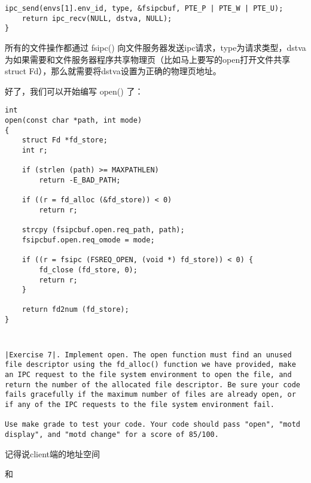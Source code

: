 \documentclass{article}
\newcommand{\funcname}[1]{{\ttfamily \small #1}}
\begin{document}
\begin{CJK*}{UTF8}{gkai}
\begin{lstlisting}[style=ccode, title={\scriptsize \ttfamily \bfseries lib/file.c: fsipc()}]
	ipc_send(envs[1].env_id, type, &fsipcbuf, PTE_P | PTE_W | PTE_U);
	return ipc_recv(NULL, dstva, NULL);
}
\end{lstlisting}

所有的文件操作都通过 \funcname{fsipc()} 向文件服务器发送ipc请求，type为请求类型，dstva为如果需要和文件服务器程序共享物理页（比如马上要写的open打开文件共享struct Fd），那么就需要将dstva设置为正确的物理页地址。

好了，我们可以开始编写 \funcname{open()} 了：


\begin{lstlisting}[style=ccode, title={\scriptsize \ttfamily \bfseries lib/file.c: open()}]
int
open(const char *path, int mode)
{
    struct Fd *fd_store;
    int r;

    if (strlen (path) >= MAXPATHLEN)
        return -E_BAD_PATH;

    if ((r = fd_alloc (&fd_store)) < 0)
        return r;

    strcpy (fsipcbuf.open.req_path, path);
    fsipcbuf.open.req_omode = mode;

    if ((r = fsipc (FSREQ_OPEN, (void *) fd_store)) < 0) {
        fd_close (fd_store, 0);
        return r;
    }

    return fd2num (fd_store);
}
\end{lstlisting}
\begin{lstlisting}[style=ccode, title={\scriptsize \ttfamily \bfseries kern/: ()}]
\end{lstlisting}
\begin{lstlisting}[style=ccode, title={\scriptsize \ttfamily \bfseries kern/: ()}]
\end{lstlisting}

	
\begin{lstlisting}[style=exercise]
|Exercise 7|. Implement open. The open function must find an unused file descriptor using the fd_alloc() function we have provided, make an IPC request to the file system environment to open the file, and return the number of the allocated file descriptor. Be sure your code fails gracefully if the maximum number of files are already open, or if any of the IPC requests to the file system environment fail.

Use make grade to test your code. Your code should pass "open", "motd display", and "motd change" for a score of 85/100.
\end{lstlisting}

记得说client端的地址空间

和


\end{CJK*}
\end{document}
